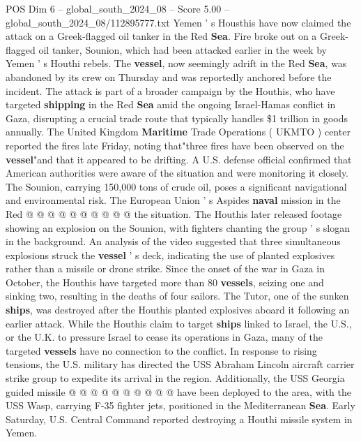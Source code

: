 \begin{textsample}{POS Dim 6 – global\_south\_2024\_08 – Score 5.00 – global\_south\_2024\_08/112895777.txt}  \label{ex:f6_pos_387}
Yemen ' s Housthis have now claimed the attack on a Greek-flagged oil tanker in the Red \textbf{Sea}.
Fire broke out on a Greek-flagged oil tanker, Sounion, which had been attacked earlier in the week by Yemen ' s Houthi rebels.
The \textbf{vessel}, now seemingly adrift in the Red \textbf{Sea}, was abandoned by its crew on Thursday and was reportedly anchored before the incident.
The attack is part of a broader campaign by the Houthis, who have targeted \textbf{shipping} in the Red \textbf{Sea} amid the ongoing Israel-Hamas conflict in Gaza, disrupting a crucial trade route that typically handles \$1 trillion in goods annually.
The United Kingdom \textbf{Maritime} Trade Operations ( UKMTO ) center reported the fires late Friday, noting that"three fires have been observed on the \textbf{vessel}"and that it appeared to be drifting.
A U.S. defense official confirmed that American authorities were aware of the situation and were monitoring it closely.
The Sounion, carrying 150,000 tons of crude oil, poses a significant navigational and environmental risk.
The European Union ' s Aspides \textbf{naval} mission in the Red @ @ @ @ @ @ @ @ @ @ the situation.
The Houthis later released footage showing an explosion on the Sounion, with fighters chanting the group ' s slogan in the background.
An analysis of the video suggested that three simultaneous explosions struck the \textbf{vessel} ' s deck, indicating the use of planted explosives rather than a missile or drone strike.
Since the onset of the war in Gaza in October, the Houthis have targeted more than 80 \textbf{vessels}, seizing one and sinking two, resulting in the deaths of four sailors.
The Tutor, one of the sunken \textbf{ships}, was destroyed after the Houthis planted explosives aboard it following an earlier attack.
While the Houthis claim to target \textbf{ships} linked to Israel, the U.S., or the U.K. to pressure Israel to cease its operations in Gaza, many of the targeted \textbf{vessels} have no connection to the conflict.
In response to rising tensions, the U.S. military has directed the USS Abraham Lincoln aircraft carrier strike group to expedite its arrival in the region.
Additionally, the USS Georgia guided missile @ @ @ @ @ @ @ @ @ @ have been deployed to the area, with the USS Wasp, carrying F-35 fighter jets, positioned in the Mediterranean \textbf{Sea}.
Early Saturday, U.S.
Central Command reported destroying a Houthi missile system in Yemen.

\end{textsample}
